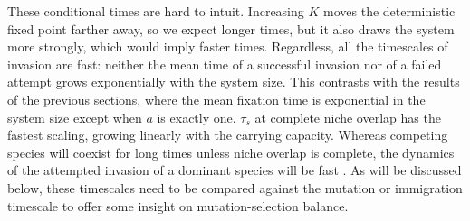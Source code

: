These conditional times are hard to intuit. 
Increasing $K$ moves the deterministic fixed point farther away, so we expect longer times, but it also draws the system more strongly, which would imply faster times. 
Regardless, all the timescales of invasion are fast:
neither the mean time of a successful invasion nor of a failed attempt grows exponentially with the system size. 
This contrasts with the results of the previous sections, where the mean fixation time is exponential in the system size except when $a$ is exactly one. 
$\tau_{s}$ at complete niche overlap has the fastest scaling, growing linearly with the carrying capacity. 
Whereas competing species will coexist for long times unless niche overlap is complete, the dynamics of the attempted invasion of a dominant species will be fast \cite{invasion is fast}. 
As will be discussed below, these timescales need to be compared against the mutation or immigration timescale to offer some insight on mutation-selection balance. 



